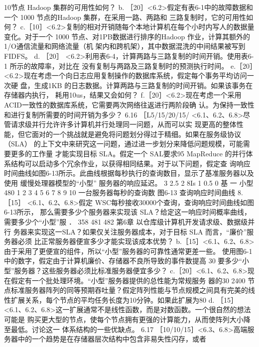 10节点 Hadoop 集群的可用性如何？
b. ［20］<6.2>假定有表6-1中的故障数据和一个 1000 节点的Hadoop 集群，在采用一路、两路和
三路复制时，它的可用性如何？
c.［10］<6.2>复制的相对开销随每个本地计算机在每个小时内写人的数据量变化。对于一个
1000 节点、对1PB数据进行排序的Hadoop 作业，计算其额外的1/O通信流量和网络流量（机
架内和跨机架），其中数据混洗的中间结果被写到 FIDFS。
d. ［20］ <6.2>利用表6-4，计算两路与三路复制的时间开销。使用表6-1 所示的故障率，对比在
没有复制与两路及三路复制时的预测执行时间。
e.［20］<6.2>现在考虑一个向日志应用复制操作的数据库系统，假定每个事务平均访问一次硬
盘，生成1KB 的日志数据。计算两路与三路复制的时间开销。如果该事务在存储器内执行，
耗用10us，结果又会如何？
f.［20］<6.2>现在考虑一个采用ACID一致性的数据库系统，它需要两次网络往返进行两阶段确
认。为保持一致性和进行复制所需要的时间开销为多少？
6.16 ［L5/15/20/15/ <6.1、6.2、6.8>尽管请求级并行允许许多计算机并行处理同一问题，从而可以实
现更高的整体性能，但它面对的一个挑战就是避免将问题划分得过于精细。如果在服务级协议
（SLA） 的上下文中来研究这一问题，通过进一步划分来降低问题规模，可能需要更多的工作量
才能实现目标 SLA。假定一个 SAL要求95%
MapReduce 的并行体系结构可以启动多个冗余作业，以获得相同结果。对于以下问题，假定查
询响应时间曲线如图6-13所示。此曲线根据每秒执行的查询数目，显示了基准服务器以及使用
缓慢处理器模型的“小型” 服务器的响应延迟。
3
2.5
2
8Is
1
0.5
0
基
一 小型
480
1
2
3
4
5
6
7
8
9
10
一台服务器每秒的查询数
图6-13 查询响应时间曲线
8.［15］ <6.1、6.2、6.8>假定 WSC每秒接收30000个查询，查询响应时间曲线如图6-13所示，
那么需要多少个服务器来实现该 SLA？给定这一响应时间概率曲线，需要多少个“小型”服
．
358
481
482
第6章 以仓库级计算机开发请求级、数据级并行
务器来实现这一SLA？如果仅关注服务器成本，对于目标 SLA 而言，“廉价”服务器必须
比正常服务器便宣多少才能实现该成本优势？
b.［15］<6.1、6.2、6.8>由于采用了更便宣的组件，所以“小型”服务器的可靠性通常更差一些。
使用图6-1中的数字，假定由于计算机廉价、存储器不良所导致的事件数提高 30%
要多少“小型”服务器？这些服务器必须比标准服务器便宜多少？
c.［20］<6.1、6.2、6.8>现在假定有一个批处理环境。“小型”服务器提供的总性能为常规服务
器的30%
2400 节点标准服务器阵列的同等预期吞吐量？假定阵列性能与节点规模之间具有完美的线
性扩展关系，每个节点的平均任务长度为10分钟。如果此扩展为80%
d. ［15］<6.1、6.2、6.8>这一扩展通常不是线性函数，而是对数函数。一个很自然的想法可能是
购买更大型的节点，使每个节点拥有更强的计算能力，从而使阵列大小降至最低。讨论这一
体系结构的一些优缺点。
6.17
［10/10/15］<6.3、6.8>高端服务器中的一个趋势是在存储器层次结构中包含非易失性闪存，或者
